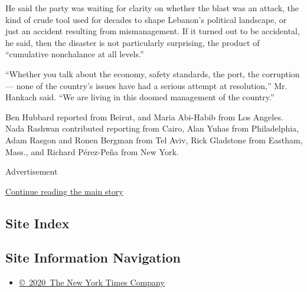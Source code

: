 He said the party was waiting for clarity on whether the blast was an
attack, the kind of crude tool used for decades to shape Lebanon's
political landscape, or just an accident resulting from mismanagement.
If it turned out to be accidental, he said, then the disaster is not
particularly surprising, the product of ``cumulative nonchalance at all
levels.''

``Whether you talk about the economy, safety standards, the port, the
corruption --- none of the country's issues have had a serious attempt
at resolution,'' Mr. Hankach said. ``We are living in this doomed
management of the country.''

Ben Hubbard reported from Beirut, and Maria Abi-Habib from Los Angeles.
Nada Rashwan contributed reporting from Cairo, Alan Yuhas from
Philadelphia, Adam Rasgon and Ronen Bergman from Tel Aviv, Rick
Gladstone from Eastham, Mass., and Richard Pérez-Peña from New York.

Advertisement

\protect\hyperlink{after-bottom}{Continue reading the main story}

\hypertarget{site-index}{%
\subsection{Site Index}\label{site-index}}

\hypertarget{site-information-navigation}{%
\subsection{Site Information
Navigation}\label{site-information-navigation}}

\begin{itemize}
\tightlist
\item
  \href{https://help.nytimes.com/hc/en-us/articles/115014792127-Copyright-notice}{©~2020~The
  New York Times Company}
\end{itemize}

